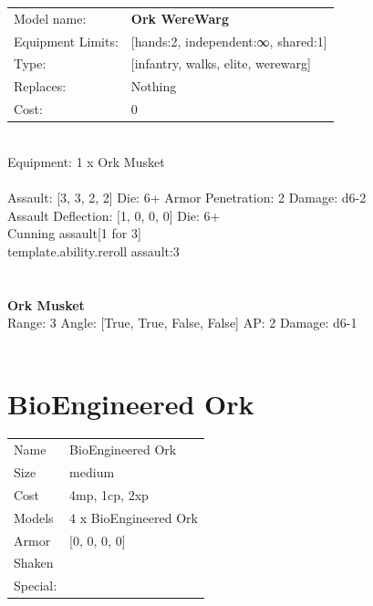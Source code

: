 \noindent
\begin{tabular}{ll}
Model name: &{\bf Ork WereWarg } \\
Equipment Limits: &[hands:2, independent:∞, shared:1] \\
Type: &[infantry, walks, elite, werewarg] \\
Replaces: &Nothing \\
Cost: & 0\\
\end{tabular}
\ \\
Equipment: 1 x Ork Musket \\
\ \\
Assault: [3, 3, 2, 2] Die: 6+ Armor Penetration: 2 Damage: d6-2 \\
Assault Deflection: [1, 0, 0, 0] Die: 6+\\
\indent Cunning assault[1 for 3]\\ 
{template.ability.reroll assault:3}\\ 
 
\ \\

\ \\
{\bf Ork Musket } \\



Range: 3  Angle: [True, True, False, False] AP: 2 Damage: d6-1 \\




 
\ \\













\clearpage

\section{ BioEngineered Ork }

\begin{tabular}{ll}
  Name & BioEngineered Ork \\
  Size & medium\\
  Cost & 4mp, 1cp, 2xp\\
  Models & 4 x BioEngineered Ork\\
  Armor & [0, 0, 0, 0]\\
  Shaken & \\
  Special: \\
\end{tabular}

